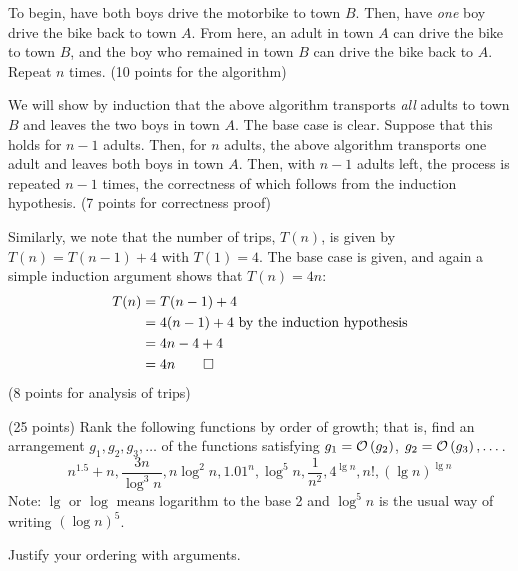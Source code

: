 \documentclass[final]{article}
\begin{document}
\begin{solution}
    To begin, have both boys drive the motorbike to town $B$. Then, have \emph{one} boy drive the bike back to town $A$. From here, an adult in town $A$ can drive the bike to town $B$, and the boy who remained in town $B$ can drive the bike back to $A$. Repeat $n$ times. (10 points for the algorithm)

    We will show by induction that the above algorithm transports \emph{all} adults to town $B$ and leaves the two boys in town $A$. The base case is clear. Suppose that this holds for $n - 1$ adults. Then, for $n$ adults, the above algorithm transports one adult and leaves both boys in town $A$. Then, with $n - 1$ adults left, the process is repeated $n - 1$ times, the correctness of which follows from the induction hypothesis. (7 points for correctness proof)

    Similarly, we note that the number of trips, $T(n)$, is given by $T(n) = T(n - 1) + 4$ with $T(1) = 4$. The base case is given, and again a simple induction argument shows that $T(n) = 4n$:
    \begin{align*}T(n)
         & = T(n - 1) + 4                                     \\
         & = 4(n - 1) + 4 \hbox{ by the induction hypothesis} \\
         & = 4n - 4 + 4                                       \\
         & = 4n\qedhere
    \end{align*}
    (8 points for analysis of trips)
\end{solution}

\begin{exercise}{2.12} (25 points)
    Rank the following functions by order of growth; that is, find an
    arrangement $g_1, g_2, g_3, \dots$ of the functions satisfying
    $g_1=\mathcal{O}\left(g_2\right)$, $g_2=\mathcal{O}\left(g_3\right), \dots$.
    \[n^{1.5} + n, \frac{3n}{\log^3 n}, n \log^2 n, 1.01^n,   \log^{5} n,
        \frac{1}{n^2},  4^{\lg n}, n!,  (\lg n)^{\lg n}\]
    Note: $\lg$ or $\log$ means logarithm to the base 2 and $\log^{5} n$ is the usual way of writing
    $(\log n)^{5}$.

    Justify your ordering with arguments.
\end{exercise}
\end{document}
